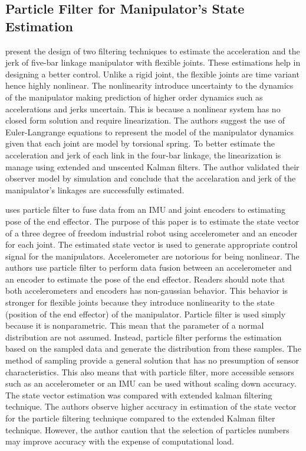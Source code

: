 \subsection{Particle Filter for Manipulator's State Estimation}\label{sec:particle_filter_state_estimation}

\textcite{Badamchizadeh2010} present the design of two filtering techniques to estimate the
acceleration and the jerk of five-bar linkage manipulator with flexible joints. These estimations
help in designing a better control. Unlike a rigid joint, the flexible joints are time variant hence
highly nonlinear. The nonlinearity introduce uncertainty to the dynamics of the manipulator
making prediction of higher order dynamics such as accelerations and jerks uncertain. This is
because a nonlinear system has no closed form solution and require linearization. The authors
suggest the use of Euler-Langrange equations to represent the model of the manipulator
dynamics given that each joint are model by torsional spring. To better estimate the acceleration
and jerk of each link in the four-bar linkage, the linearization is manage using extended and
unscented Kalman filters. The author validated their observer model by simulation and conclude
that the accelaration and jerk of the manipulator's linkages are successfully estimated.

\textcite{Rigatos2009} uses particle filter to fuse data from an \acrfull{IMU} and joint encoders to
estimating pose of the end effector. The purpose of this paper is to estimate the state vector of a
three degree of freedom industrial robot using accelerometer and an encoder for each joint. The
estimated state vector is used to generate appropriate control signal for the manipulators.
Accelerometer are notorious for being nonlinear. The authors
use particle filter to perform data fusion between an accelerometer and an encoder to estimate
the pose of the end effector. Readers should note that both accelerometers and encoders has
non-gaussian behavior. This behavior is stronger for flexible joints because they introduce
nonlinearity to the state (position of the end effector) of the manipulator. Particle filter is used
simply because it is nonparametric. This mean that the parameter of a normal distribution are
not assumed. Instead, particle filter performs the estimation based on the sampled data and
generate the distribution from these samples. The method of sampling provide a general
solution that has no presumption of sensor characteristics. This also means that with particle
filter, more accessible sensors such as an accelerometer or an IMU can be used without scaling
down accuracy. The state vector estimation was compared with extended kalman filtering
technique. The authors observe higher accuracy in estimation of the state vector for the particle
filtering technique compared to the extended Kalman filter technique. However, the author
caution that the selection of particles numbers may improve accuracy with the expense of
computational load.

